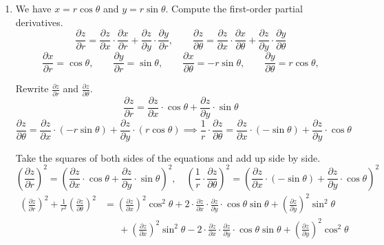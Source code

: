 \documentclass[a4paper, 12pt]{article}
\begin{document}
\begin{enumerate}[leftmargin=*,label=\textbf{\arabic*.}]
Calculate the volume of the outer cylinder.
\[V(1,4)=\pi\cdot1^2\cdot4=4\pi\]

Take $\displaystyle\Delta V\approx dV=-\frac\pi6$. Therefore, the volume of the interior can be approximated as follows.
\[\boxed{V\approx4\pi-\frac\pi6=\frac{23\pi}6}\]

\newpage

\item We have $x=r\cos\theta$ and $y=r\sin\theta$. Compute the first-order partial derivatives.
\[\frac{\partial z}{\partial r}=\frac{\partial z}{\partial x}\cdot\frac{\partial x}{\partial r}+\frac{\partial z}{\partial y}\cdot\frac{\partial y}{\partial r},\qquad\frac{\partial z}{\partial \theta}=\frac{\partial z}{\partial x}\cdot\frac{\partial x}{\partial \theta}+\frac{\partial z}{\partial y}\cdot\frac{\partial y}{\partial \theta}\]
\[\frac{\partial x}{\partial r}=\cos\theta,\qquad\frac{\partial y}{\partial r}=\sin\theta,\qquad\frac{\partial x}{\partial \theta}=-r\sin\theta,\qquad\frac{\partial y}{\partial\theta}=r\cos\theta,\]

Rewrite $\displaystyle\frac{\partial z}{\partial r}$ and $\displaystyle\frac{\partial z}{\partial\theta}$.
\[\frac{\partial z}{\partial r}=\frac{\partial z}{\partial x}\cdot\cos\theta+\frac{\partial z}{\partial y}\cdot\sin\theta\]
\[\frac{\partial z}{\partial\theta}=\frac{\partial z}{\partial x}\cdot(-r\sin\theta)+\frac{\partial z}{\partial y}\cdot(r\cos\theta)\implies\frac1r\cdot\frac{\partial z}{\partial\theta}=\frac{\partial z}{\partial x}\cdot(-\sin\theta)+\frac{\partial z}{\partial y}\cdot\cos\theta\]

Take the squares of both sides of the equations and add up side by side.
\[\left(\frac{\partial z}{\partial r}\right)^2=\left(\frac{\partial z}{\partial x}\cdot\cos\theta+\frac{\partial z}{\partial y}\cdot\sin\theta\right)^2,\quad\left(\frac1r\cdot\frac{\partial z}{\partial\theta}\right)^2=\left(\frac{\partial z}{\partial x}\cdot(-\sin\theta)+\frac{\partial z}{\partial y}\cdot\cos\theta\right)^2\]
\begin{align*}
\left(\frac{\partial z}{\partial r}\right)^2+\frac1{r^2}\left(\frac{\partial z}{\partial\theta}\right)^2&=\left(\frac{\partial z}{\partial x}\right)^2\cos^2\theta+2\cdot\frac{\partial z}{\partial x}\cdot\frac{\partial z}{\partial y}\cdot\cos\theta\sin\theta+\left(\frac{\partial z}{\partial y}\right)^2\sin^2\theta\\[1em]&\quad\:\;+\left(\frac{\partial z}{\partial x}\right)^2\sin^2\theta-2\cdot\frac{\partial z}{\partial x}\cdot\frac{\partial z}{\partial y}\cdot\cos\theta\sin\theta+\left(\frac{\partial z}{\partial y}\right)^2\cos^2\theta
\end{align*}


\end{enumerate}
\end{document}
